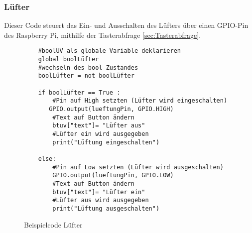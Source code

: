 \subsubsection{Lüfter}\label{sec: lüfter test}
Dieser Code steuert das Ein- und Ausschalten des Lüfters über einen GPIO-Pin des Raspberry Pi, mithilfe der Tasterabfrage \ref{sec:Tasterabfrage}.
\vspace{3mm}
\begin{figure}[H]
    \centering
    \begin{verbatim}
    #boolUV als globale Variable deklarieren
    global boolLüfter
    #wechseln des bool Zustandes
    boolLüfter = not boolLüfter

    if boolLüfter == True :
        #Pin auf High setzten (Lüfter wird eingeschalten)
       GPIO.output(lueftungPin, GPIO.HIGH)
        #Text auf Button ändern
        btuv["text"]= "Lüfter aus" 
        #Lüfter ein wird ausgegeben
        print("Lüftung eingeschalten")
        
    else:
        #Pin auf Low setzten (Lüfter wird ausgeschalten)
        GPIO.output(lueftungPin, GPIO.LOW)
        #Text auf Button ändern
        btuv["text"]= "Lüfter ein"
        #Lüfter aus wird ausgegeben
        print("Lüftung ausgeschalten")
    \end{verbatim}
    \caption{Beispielcode Lüfter}
\end{figure}
